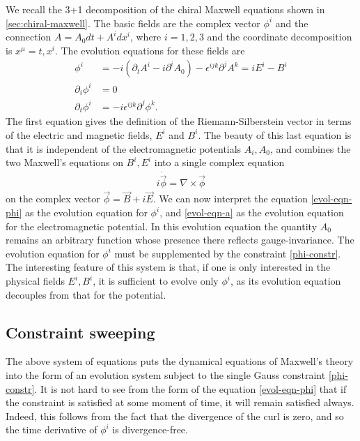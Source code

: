 \documentclass[10pt]{report}
\theoremstyle{definition}
\newcommand{\im}{i}
\begin{document}
We recall the 3+1 decomposition of the chiral Maxwell equations shown in \cref{sec:chiral-maxwell}. The basic fields are the complex vector $\phi^i$ and the connection $A = A_0 dt + A^i dx^i$, where $i = 1,2,3$ and the coordinate decomposition is $x^\mu = t,x^i$. The evolution equations for these fields are
\begin{align}
    \phi^i  & = -\im (\partial_t A^i -\im  \partial^i A_0) - \epsilon^{ijk} \partial^j A^k = i E^i - B^i \label{evol-eqn-a} \\
    \partial_i \phi^i & = 0 \label{phi-constr} \\
    \partial_t \phi^i & = -i \epsilon^{ijk} \partial^j \phi^k. \label{evol-eqn-phi}
\end{align}
The first equation gives the definition of the Riemann-Silberstein vector in terms of the electric and magnetic fields, $E^i$ and $B^i$. The beauty of this last equation is that it is independent of the electromagnetic potentials $A_i, A_0$, and combines the two Maxwell's equations on $B^i, E^i$ into a single complex equation 
\begin{align}\label{evol-eqn-M-compl}
\im \dot{\vec{\phi}} =\nabla \times \vec{\phi}
\end{align}
on the complex vector $\vec{\phi}= \vec{B}+\im \vec{E}$. We can now interpret the equation \cref{evol-eqn-phi} as the evolution equation for $\phi^i$, and \cref{evol-eqn-a} as the evolution equation for the electromagnetic potential. In this evolution equation the quantity $A_0$ remains an arbitrary function whose presence there reflects gauge-invariance. The evolution equation for $\phi^i$ must be supplemented by the constraint \cref{phi-constr}. The interesting feature of this system is that, if one is only interested in the physical fields $E^i, B^i$, it is sufficient to evolve only $\phi^i$, as its evolution equation decouples from that for the potential. 

\subsection{Constraint sweeping}

The above system of equations puts the dynamical equations of Maxwell's theory into the form of an evolution system subject to the single Gauss constraint \cref{phi-constr}. It is not hard to see from the form of the equation \cref{evol-eqn-phi} that if the constraint is satisfied at some moment of time, it will remain satisfied always. Indeed, this follows from the fact that the divergence of the curl is zero, and so the time derivative of $\phi^i$ is divergence-free.
\end{document}
